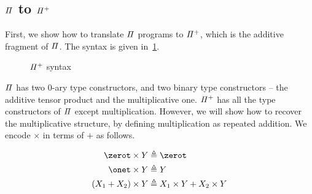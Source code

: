\subsection{$\mathit{\Pi}$ to $\mathit{{\Pi}^{+}}$}

First, we show how to translate $\mathit{\Pi}$ programs to $\mathit{{\Pi}^{+}}$, which is the additive fragment of $\mathit{\Pi}$. The
syntax is given in~\cref{fig:piplus}.

\begin{figure}[t]
  {}

  {}
  \caption{$\mathit{{\Pi}^{+}}$ syntax}
  \label{fig:piplus}
\end{figure}

$\mathit{\Pi}$ has two 0-ary type constructors, and two binary type constructors -- the additive tensor product and the
multiplicative one. $\mathit{{\Pi}^{+}}$ has all the type constructors of $\mathit{\Pi}$ except multiplication. However, we will
show how to recover the multiplicative structure, by defining multiplication as repeated addition. We encode $\times$ in
terms of $+$ as follows.

\begin{definition}[$\times : \UPlus \to \UPlus \to \UPlus$]
  \begin{align*}
    \zerot \times Y      & \defeq \zerot                      \\
    \onet \times Y       & \defeq Y                           \\
    (X_1 + X_2) \times Y & \defeq X_1 \times Y + X_2 \times Y
  \end{align*}
\end{definition}

